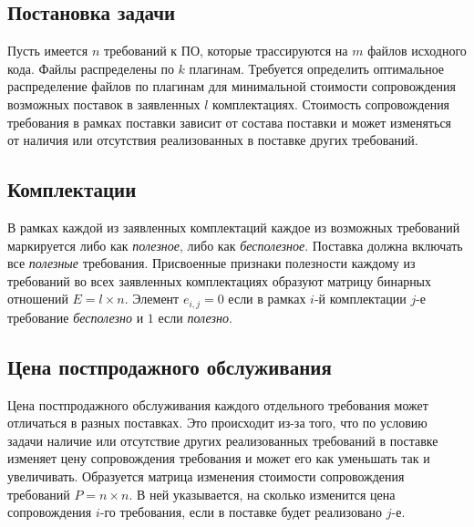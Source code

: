 

\subsection*{Постановка задачи}
Пусть имеется $n$ требований к ПО, которые трассируются на $m$ файлов исходного кода. Файлы распределены по $k$ плагинам. Требуется определить оптимальное распределение файлов по плагинам для минимальной стоимости сопровождения возможных поставок в заявленных $l$ комплектациях. Стоимость сопровождения требования в рамках поставки зависит от состава поставки и может изменяться от наличия или отсутствия реализованных в поставке других требований.

\subsection*{Комплектации}
В рамках каждой из заявленных комплектаций каждое из возможных требований маркируется либо как \textit{полезное}, либо как \textit{бесполезное}. Поставка должна включать все \textit{полезные} требования. Присвоенные признаки полезности каждому из требований во всех заявленных комплектациях образуют матрицу бинарных отношений $E = l \times n$. Элемент $e_{i, j} = 0$ если в рамках $i$-й комплектации $j$-е требование \textit{бесполезно} и $1$ если \textit{полезно}.

\subsection*{Цена постпродажного обслуживания}
Цена постпродажного обслуживания каждого отдельного требования может отличаться в разных поставках. Это происходит из-за того, что по условию задачи наличие или отсутствие других реализованных требований в поставке изменяет цену сопровождения требования и может его как уменьшать так и увеличивать. Образуется матрица изменения стоимости сопровождения требований $P = n \times n$. В ней указывается, на сколько изменится цена сопровождения $i$-го требования, если в поставке будет реализовано $j$-е.

